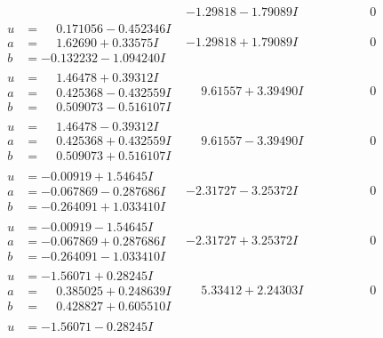\documentclass[1p]{elsarticle_modified}
\theoremstyle{definition}
\begin{document}
$$\begin{array}{c|c|c}
 & -1.29818 - 1.79089 I & \phantom{-0.000000 } 0 \\ \hline\begin{aligned}
u &= \phantom{-}0.171056 - 0.452346 I \\
a &= \phantom{-}1.62690 + 0.33575 I \\
b &= -0.132232 - 1.094240 I\end{aligned}
 & -1.29818 + 1.79089 I & \phantom{-0.000000 } 0 \\ \hline\begin{aligned}
u &= \phantom{-}1.46478 + 0.39312 I \\
a &= \phantom{-}0.425368 - 0.432559 I \\
b &= \phantom{-}0.509073 - 0.516107 I\end{aligned}
 & \phantom{-}9.61557 + 3.39490 I & \phantom{-0.000000 } 0 \\ \hline\begin{aligned}
u &= \phantom{-}1.46478 - 0.39312 I \\
a &= \phantom{-}0.425368 + 0.432559 I \\
b &= \phantom{-}0.509073 + 0.516107 I\end{aligned}
 & \phantom{-}9.61557 - 3.39490 I & \phantom{-0.000000 } 0 \\ \hline\begin{aligned}
u &= -0.00919 + 1.54645 I \\
a &= -0.067869 - 0.287686 I \\
b &= -0.264091 + 1.033410 I\end{aligned}
 & -2.31727 - 3.25372 I & \phantom{-0.000000 } 0 \\ \hline\begin{aligned}
u &= -0.00919 - 1.54645 I \\
a &= -0.067869 + 0.287686 I \\
b &= -0.264091 - 1.033410 I\end{aligned}
 & -2.31727 + 3.25372 I & \phantom{-0.000000 } 0 \\ \hline\begin{aligned}
u &= -1.56071 + 0.28245 I \\
a &= \phantom{-}0.385025 + 0.248639 I \\
b &= \phantom{-}0.428827 + 0.605510 I\end{aligned}
 & \phantom{-}5.33412 + 2.24303 I & \phantom{-0.000000 } 0 \\ \hline\begin{aligned}
u &= -1.56071 - 0.28245 I \\

\end{aligned}
\end{array}$$
\end{document}
